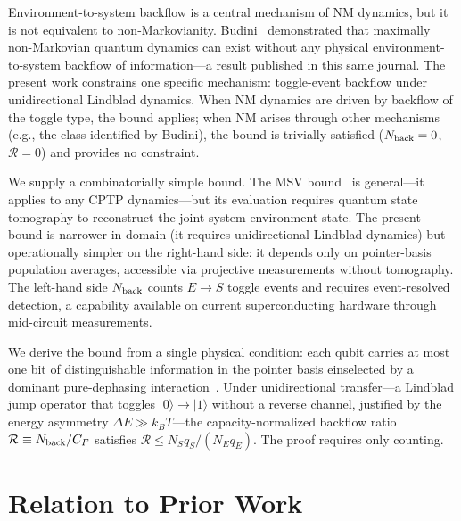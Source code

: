 \documentclass[aps,pra,twocolumn,superscriptaddress,floatfix]{revtex4-2}
\begin{document}
Environment-to-system backflow is a central mechanism of NM dynamics, but it is not equivalent to non-Markovianity. Budini~\cite{Budini:2018} demonstrated that maximally non-Markovian quantum dynamics can exist without any physical environment-to-system backflow of information---a result published in this same journal. The present work constrains one specific mechanism: toggle-event backflow under unidirectional Lindblad dynamics. When NM dynamics are driven by backflow of the toggle type, the bound applies; when NM arises through other mechanisms (e.g., the class identified by Budini), the bound is trivially satisfied ($N_{\rm back}=0$, $\mathcal{R}=0$) and provides no constraint.

We supply a combinatorially simple bound. The MSV bound~\cite{Megier:2021} is general---it applies to any CPTP dynamics---but its evaluation requires quantum state tomography to reconstruct the joint system-environment state. The present bound is narrower in domain (it requires unidirectional Lindblad dynamics) but operationally simpler on the right-hand side: it depends only on pointer-basis population averages, accessible via projective measurements without tomography. The left-hand side $N_{\rm back}$ counts $E \to S$ toggle events and requires event-resolved detection, a capability available on current superconducting hardware through mid-circuit measurements.

We derive the bound from a single physical condition: each qubit carries at most one bit of distinguishable information in the pointer basis einselected by a dominant pure-dephasing interaction~\cite{Zurek:2003}. Under unidirectional transfer---a Lindblad jump operator that toggles $|0\rangle \to |1\rangle$ without a reverse channel, justified by the energy asymmetry $\Delta E \gg k_B T$---the capacity-normalized backflow ratio $\mathcal{R} \equiv N_{\rm back}/C_F$ satisfies $\mathcal{R} \leq N_S q_S/(N_E q_E)$. The proof requires only counting.

\section{Relation to Prior Work}
\end{document}
